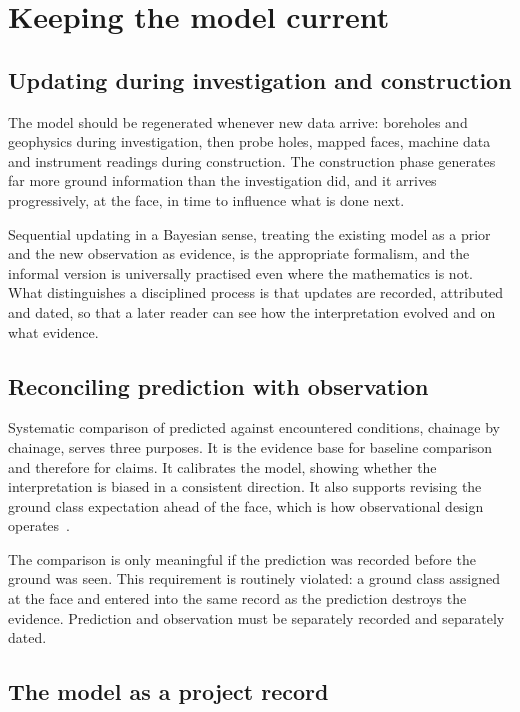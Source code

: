 \section{Keeping the model current}
\label{sec:model-updating}

\subsection{Updating during investigation and construction}
\label{sec:model-update-cycle}

The model should be regenerated whenever new data arrive: boreholes and
geophysics during investigation, then probe holes, mapped faces, machine data
and instrument readings during construction. The construction phase generates
far more ground information than the investigation did, and it arrives
progressively, at the face, in time to influence what is done next.

Sequential updating in a Bayesian sense, treating the existing model as a
prior and the new observation as evidence, is the appropriate formalism,
and the informal version is universally practised even where the mathematics
is not. What distinguishes a disciplined process is that updates are recorded,
attributed and dated, so that a later reader can see how the interpretation
evolved and on what evidence.

\subsection{Reconciling prediction with observation}
\label{sec:prediction-vs-observation}

Systematic comparison of predicted against encountered conditions, chainage by
chainage, serves three purposes. It is the evidence base for baseline
comparison and therefore for claims. It calibrates the model, showing whether
the interpretation is biased in a consistent direction. It also supports
revising the ground class expectation ahead of the face, which is
how observational design
operates~\citep{peck1969observational,nicholson1999observational}.

The comparison is only meaningful if the prediction was recorded before the
ground was seen. This requirement is routinely violated: a ground class
assigned at the face and entered into the same record as the prediction
destroys the evidence. Prediction and observation must be separately recorded
and separately dated.

\subsection{The model as a project record}
\label{sec:model-as-record}

